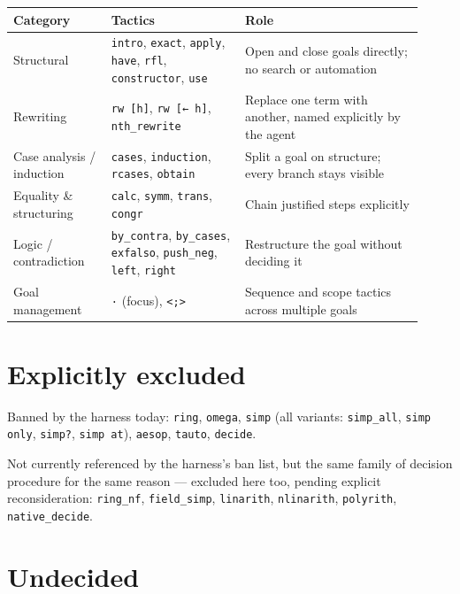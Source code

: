 \begin{center}
\begin{tabular}{@{}p{0.22\linewidth}p{0.30\linewidth}p{0.40\linewidth}@{}}
\hline
\textbf{Category} & \textbf{Tactics} & \textbf{Role} \\
\hline
Structural & \texttt{intro}, \texttt{exact}, \texttt{apply}, \texttt{have}, \texttt{rfl}, \texttt{constructor}, \texttt{use} & Open and close goals directly; no search or automation \\
Rewriting & \texttt{rw [h]}, \texttt{rw [← h]}, \texttt{nth\_rewrite} & Replace one term with another, named explicitly by the agent \\
Case analysis / induction & \texttt{cases}, \texttt{induction}, \texttt{rcases}, \texttt{obtain} & Split a goal on structure; every branch stays visible \\
Equality \& structuring & \texttt{calc}, \texttt{symm}, \texttt{trans}, \texttt{congr} & Chain justified steps explicitly \\
Logic / contradiction & \texttt{by\_contra}, \texttt{by\_cases}, \texttt{exfalso}, \texttt{push\_neg}, \texttt{left}, \texttt{right} & Restructure the goal without deciding it \\
Goal management & \texttt{·} (focus), \texttt{<;>} & Sequence and scope tactics across multiple goals \\
\hline
\end{tabular}
\end{center}

\section{Explicitly excluded}

Banned by the harness today: \texttt{ring}, \texttt{omega}, \texttt{simp} (all variants: \texttt{simp\_all}, \texttt{simp only}, \texttt{simp?}, \texttt{simp at}), \texttt{aesop}, \texttt{tauto}, \texttt{decide}.

Not currently referenced by the harness's ban list, but the same family of decision procedure for the same reason --- excluded here too, pending explicit reconsideration: \texttt{ring\_nf}, \texttt{field\_simp}, \texttt{linarith}, \texttt{nlinarith}, \texttt{polyrith}, \texttt{native\_decide}.

\section{Undecided}

